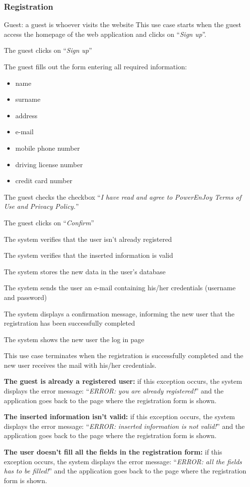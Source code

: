 \newcommand{\Event}[1]{
	\item #1
}

\newcommand{\Exc}[2]{
	\item \textbf{#1:} #2
	
}


\subsubsection{Registration}
\toggletrue{exception}
\begin{UseCase}
	{Guest: a guest is whoever visits the website}
	{This use case starts when the guest access the homepage of the web application and clicks on ``\textit{Sign up}''.}
	{
		\Event{The guest clicks on ``\textit{Sign up}''}
		\Event{The guest fills out the form entering all required information:
			\begin{itemize}
				\item name
				\item surname
				\item address
				\item e-mail
				\item mobile phone number
				\item driving license number
				\item credit card number
		\end{itemize}}
		\Event{The guest checks the checkbox ``\textit{I have read and agree to PowerEnJoy Terms of Use and Privacy Policy.}''}
		\Event{The guest clicks on ``\textit{Confirm}''}
		\Event{The system verifies that the user isn't already registered}
		\Event{The system verifies that the inserted information is valid}
		\Event{The system stores the new data in the user's database}
		\Event{The system sends the user an e-mail containing his/her credentials (username and password)}
		\Event{The system displays a confirmation message, informing the new user that the registration has been successfully completed}
		\Event{The system shows the new user the log in page}
	}
	{This use case terminates when the registration is successfully completed and the new user receives the mail with his/her credentials.}
	{
		\Exc{The guest is already a registered user}{if this exception occurs, the system displays the error message: ``\textit{ERROR: you are already registered!}'' and the application goes back to the page where the registration form is shown.}
		\Exc{The inserted information isn't valid}{if this exception occurs, the system displays the error message: ``\textit{ERROR: inserted information is not valid!}'' and the application goes back to the page where the registration form is shown.}
		\Exc{The user doesn't fill all the fields in the registration form}{if this exception occurs, the system displays the error message: ``\textit{ERROR: all the fields has to be filled!}'' and the application goes back to the page where the registration form is shown.}
	}
\end{UseCase}


